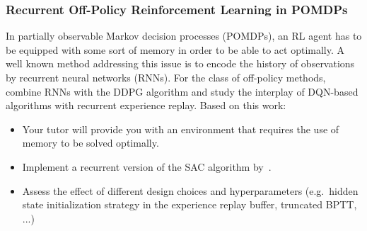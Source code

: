 \documentclass[a4paper]{article}
\begin{document}
\subsubsection{Recurrent Off-Policy Reinforcement Learning in POMDPs}
In partially observable Markov decision processes (POMDPs), an RL agent has to be equipped with some sort of memory in order to be able to act optimally.
A well known method addressing this issue is to encode the history of observations by recurrent neural networks (RNNs).
For the class of off-policy methods, \citet{heess2015} combine RNNs with the DDPG algorithm and \citet{kapturowski2018} study the interplay of DQN-based algorithms with recurrent experience replay.
Based on this work:
\begin{itemize}
  \item Your tutor will provide you with an environment that requires the use of memory to be solved optimally.
  \item Implement a recurrent version of the SAC algorithm by~\citet{Haarnoja2018a}.
  \item Assess the effect of different design choices and hyperparameters (e.g.~hidden state initialization strategy in the experience replay buffer, truncated BPTT, ...)
\end{itemize}
\end{document}
